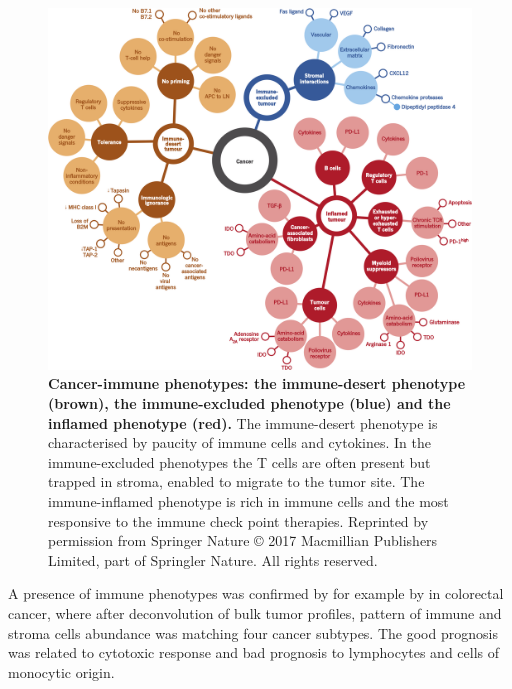 \documentclass[12pt,]{book}
\theoremstyle{definition}
\theoremstyle{definition}
\theoremstyle{definition}
\theoremstyle{remark}
\begin{document}
\begin{figure}

{\centering \includegraphics[width=1\linewidth]{figures-ext/immune-phenotypes} 

}

\caption[Cancer-immune phenotypes: the immune-desert phenotype, the immune-excluded phenotype and the inflamed phenotype.]{\textbf{Cancer-immune phenotypes: the
immune-desert phenotype (brown), the immune-excluded phenotype (blue)
and the inflamed phenotype (red).} The immune-desert phenotype is
characterised by paucity of immune cells and cytokines. In the
immune-excluded phenotypes the T cells are often present but trapped in
stroma, enabled to migrate to the tumor site. The immune-inflamed
phenotype is rich in immune cells and the most responsive to the immune
check point therapies. Reprinted by permission from Springer Nature
\citep{Chen2017} © 2017 Macmillian Publishers Limited, part of Springler
Nature. All rights reserved.}\label{fig:immune-phenotypes}
\end{figure}












A presence of immune phenotypes was confirmed by for example by
\citet{Becht2016} in colorectal cancer, where after deconvolution of
bulk tumor profiles, pattern of immune and stroma cells abundance was
matching four cancer subtypes. The good prognosis was related to
cytotoxic response and bad prognosis to lymphocytes and cells of
monocytic origin.
\end{document}
